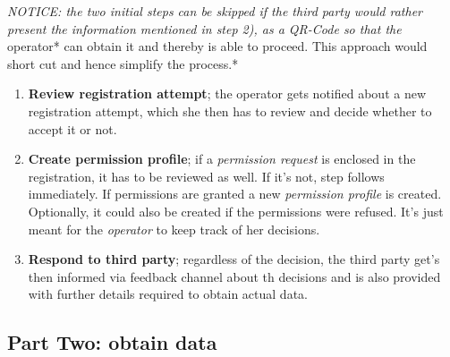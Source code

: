 \documentclass[12pt,english,a4paper,titlepage,cleardoublepage=empty,dottedtoc]{report}
\begin{document}
\emph{NOTICE: the two initial steps can be skipped if the third party
would rather present the information mentioned in step 2), as a QR-Code
so that the }operator* can obtain it and thereby is able to proceed.
This approach would short cut and hence simplify the process.*

\begin{enumerate}
\def\labelenumi{\arabic{enumi})}
\setcounter{enumi}{2}
\item
  \textbf{Review registration attempt}; the operator gets notified about
  a new registration attempt, which she then has to review and decide
  whether to accept it or not.
\item
  \textbf{Create permission profile}; if a \emph{permission request} is
  enclosed in the registration, it has to be reviewed as well. If it's
  not, step follows immediately. If permissions are granted a new
  \emph{permission profile} is created. Optionally, it could also be
  created if the permissions were refused. It's just meant for the
  \emph{operator} to keep track of her decisions.
\item
  \textbf{Respond to third party}; regardless of the decision, the third
  party get's then informed via feedback channel about th decisions and
  is also provided with further details required to obtain actual data.
\end{enumerate}

\subsection*{Part Two: obtain data}\label{part-two-obtain-data}
\end{document}
